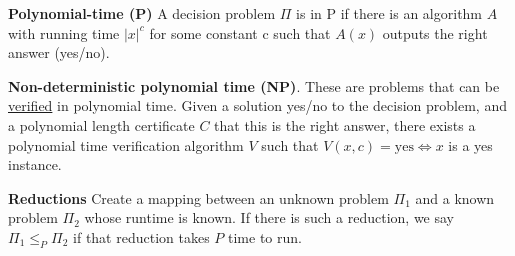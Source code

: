 \documentclass[10pt,landscape]{article}
\newcommand{\definition}[1]{\textbf{#1}\hspace{2pt}}
\begin{document}
\begin{multicols}{3}
\definition{Polynomial-time (P)} A decision problem $\Pi$ is in P if there is an algorithm $A$ with running time $|x|^c$ for some constant c such that $A(x)$ outputs the right answer (yes/no).

\definition{Non-deterministic polynomial time (NP)}. These are problems that can be \underline{verified} in polynomial time. Given a solution yes/no to the decision problem, and a polynomial length certificate $C$ that this is the right answer, there exists a polynomial time verification algorithm $V$ such that $V(x,c) = \text{yes} \Leftrightarrow x $ is a yes instance.

\definition{Reductions} Create a mapping between an unknown problem $\Pi_1$ and a known problem $\Pi_2$ whose runtime is known. If there is such a reduction, we say $\Pi_1 \leq_P \Pi_2$ if that reduction takes $P$ time to run.


\end{multicols}
\end{document}
